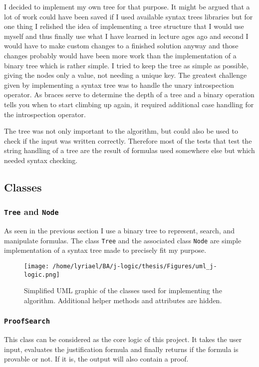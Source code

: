 I decided to implement my own tree for that purpose. It might be argued that a lot of work could have been saved if I used available syntax trees libraries but for one thing I relished the idea of implementing a tree structure that I would use myself and thus finally use what I have learned in lecture ages ago and second I would have to make custom changes to a finished solution anyway and those changes probably would have been more work than the implementation of a binary tree which is rather simple. I tried to keep the tree as simple as possible, giving the nodes only a value, not needing a unique key. The greatest challenge given by implementing a syntax tree was to handle the unary introspection operator. As braces serve to determine the depth of a tree and a binary operation tells you when to start climbing up again, it required additional case handling for the introspection operator. 

The tree was not only important to the algorithm, but could also be used to check if the input was written correctly. Therefore most of the tests that test the string handling of a tree are the result of formulas used somewhere else but which needed syntax checking. 

\subsection{Classes}

\subsubsection[Tree and Node]{\texttt{Tree} and \texttt{Node}}
As seen in the previous section I use a binary tree to represent, search, and manipulate formulas. The class \texttt{Tree} and the associated class \texttt{Node} are simple implementation of a syntax tree made to precisely fit my purpose. 

\begin{figure}[H]
	\caption{Simplified UML graphic of the classes used for implementing the algorithm. Additional helper methods and attributes are hidden.}
	\texttt{[image: /home/lyriael/BA/j-logic/thesis/Figures/uml\_j-logic.png]}
	\label{uml}
\end{figure}


\subsubsection[ProofSearch]{\texttt{ProofSearch}}
This class can be considered as the core logic of this project. It takes the user input, evaluates the justification formula and finally returns if the formula is provable or not. If it is, the output will also contain a proof.

